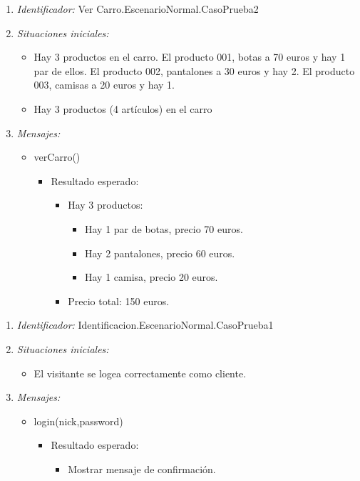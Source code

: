 \begin{enumerate}
	\item {\it Identificador:} Ver Carro.EscenarioNormal.CasoPrueba2
	\item {\it Situaciones iniciales:}
    		\begin{itemize}
    			\item Hay 3 productos en el carro. El producto 001, botas a 70 euros y hay 1 par de ellos. El producto 002, pantalones a 30 euros y hay 2. El producto 003, camisas a 20 euros y hay 1.
    			\item Hay 3 productos (4 artículos) en el carro
		\end{itemize}
	\item {\it Mensajes:}
		\begin{itemize}
			\item verCarro()
				 \begin{itemize}
					 	\item Resultado esperado:
					 \begin{itemize}
					 	 \item Hay 3 productos: 
		       			 \begin{itemize}
				   			\item Hay 1 par de botas, precio 70 euros.
				  			\item Hay 2 pantalones, precio 60 euros.
				  			\item Hay 1 camisa, precio 20 euros.
				   		\end{itemize}
				   		\item Precio total: 150 euros.
					 \end{itemize}
				 \end{itemize}
		\end{itemize}
\end{enumerate}



\begin{enumerate}
	\item {\it Identificador:} Identificacion.EscenarioNormal.CasoPrueba1
	\item {\it Situaciones iniciales:}
    		\begin{itemize}
    			\item El visitante se logea correctamente como cliente.
		\end{itemize}
	\item {\it Mensajes:}
		\begin{itemize}
			\item login(nick,password)
				 \begin{itemize}
					 	\item Resultado esperado:
					 \begin{itemize}
					 	 \item Mostrar mensaje de confirmación.
					 \end{itemize}
				 \end{itemize}
		\end{itemize}
\end{enumerate}

